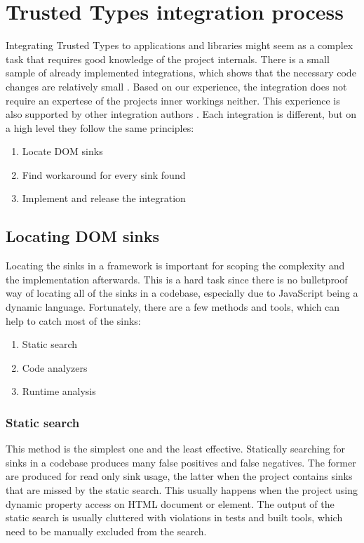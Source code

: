 \chapter{Trusted Types integration process}
\label{tt_integration_setup}

Integrating Trusted Types to applications and libraries might seem as a complex task that requires
good knowledge of the project internals. There is a small sample of already implemented
integrations, which shows that the necessary code changes are relatively small
\cite{tt_integration_list}. Based on our experience, the integration does not require an expertese
of the projects inner workings neither. This experience is also supported by other integration
authors \cite{tt_web_framework_paper}. Each integration is different, but on a high level they
follow the same principles:

\begin{enumerate}
  \item Locate DOM sinks
  \item Find workaround for every sink found
  \item Implement and release the integration
\end{enumerate}

\section{Locating DOM sinks}

Locating the sinks in a framework is important for scoping the complexity and the implementation
afterwards. This is a hard task since there is no bulletproof way of locating all of the sinks in a
codebase, especially due to JavaScript being a dynamic language. Fortunately, there are a few
methods and tools, which can help to catch most of the sinks:

\begin{enumerate}
  \item Static search
  \item Code analyzers
  \item Runtime analysis
\end{enumerate}

\subsection{Static search}

This method is the simplest one and the least effective. Statically searching for sinks in a
codebase produces many false positives and false negatives. The former are produced for read only
sink usage, the latter when the project contains sinks that are missed by the static search. This
usually happens when the project using dynamic property access on HTML document or element. The
output of the static search is usually cluttered with violations in tests and built tools, which
need to be manually excluded from the search.


